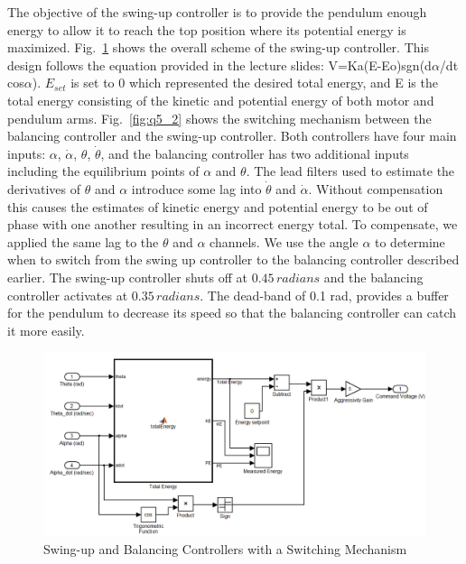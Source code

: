 \documentclass{article}
\theoremstyle{plain}
\theoremstyle{definition}
\theoremstyle{remark}
\begin{document}
The objective of the swing-up controller is to provide the pendulum enough energy to allow it to reach the top position where its potential energy is maximized.  Fig.~\ref{fig:q5_1} shows the overall scheme of the swing-up controller. This design follows the equation provided in the lecture slides: V=Ka(E-Eo)sgn(d$\alpha$/dt cos$\alpha$). $E_{set}$ is set to 0 which represented the desired total energy, and E is the total energy consisting of the kinetic and potential energy of both motor and pendulum arms.  Fig.~\ref{fig:q5_2} shows the switching mechanism between the balancing controller and the swing-up controller. Both controllers have four main inputs:  $\alpha$, $\dot{\alpha}$, $\theta$, $\dot{\theta}$, and the balancing controller has two additional inputs including the equilibrium points of $\alpha$ and $\theta$. The lead filters used to estimate the derivatives of $\theta$ and $\alpha$ introduce some lag into $\dot{\theta}$ and $\dot{\alpha}$.  Without compensation this causes the estimates of kinetic energy and potential energy to be out of phase with one another resulting in an incorrect energy total.  To compensate, we applied the same lag to the $\theta$ and $\alpha$ channels.  We use the angle $\alpha$ to determine when to switch from the swing up controller to the balancing controller described earlier. The swing-up controller shuts off at $0.45 \, radians$ and the balancing controller activates at $0.35 \, radians$.  The dead-band of 0.1 rad, provides a buffer for the pendulum to decrease its speed so that the balancing controller can catch it more easily.\\
\begin{figure}[b!]
\includegraphics[width=1\textwidth]{q5_1.png}
\caption{Swing-up and Balancing Controllers with a Switching Mechanism} \label{tex}
\label{fig:q5_1}
\end{figure}
\end{document}
